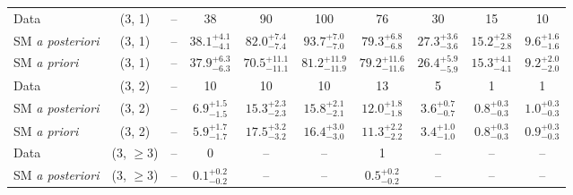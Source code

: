 \begin{table}[h!]
{\begin{tabular}{lccccccccc}
    Data                  & (3, 1)           & --                            & 38                            & 90                          & 100                         & 76                          & 30                          & 15                         & 10                         \\[0.5ex] 
    SM {\it a posteriori} & (3, 1)           & --                            & $38.1^{+ 4.1 }_{- 4.1 }$      & $82.0^{+ 7.4 }_{- 7.4 }$    & $93.7^{+ 7.0 }_{- 7.0 }$    & $79.3^{+ 6.8 }_{- 6.8 }$    & $27.3^{+ 3.6 }_{- 3.6 }$    & $15.2^{+ 2.8 }_{- 2.8 }$   & $9.6^{+ 1.6 }_{- 1.6 }$    \\[0.5ex] 
    SM {\it a priori}     & (3, 1)           & --                            & $37.9^{+ 6.3 }_{- 6.3 }$      & $70.5^{+ 11.1 }_{- 11.1 }$  & $81.2^{+ 11.9 }_{- 11.9 }$  & $79.2^{+ 11.6 }_{- 11.6 }$  & $26.4^{+ 5.9 }_{- 5.9 }$    & $15.3^{+ 4.1 }_{- 4.1 }$   & $9.2^{+ 2.0 }_{- 2.0 }$    \\[0.5ex] 
    Data                  & (3, 2)           & --                            & 10                            & 10                          & 10                          & 13                          & 5                           & 1                          & 1                          \\[0.5ex] 
    SM {\it a posteriori} & (3, 2)           & --                            & $6.9^{+ 1.5 }_{- 1.5 }$       & $15.3^{+ 2.3 }_{- 2.3 }$    & $15.8^{+ 2.1 }_{- 2.1 }$    & $12.0^{+ 1.8 }_{- 1.8 }$    & $3.6^{+ 0.7 }_{- 0.7 }$     & $0.8^{+ 0.3 }_{- 0.3 }$    & $1.0^{+ 0.3 }_{- 0.3 }$    \\[0.5ex] 
    SM {\it a priori}     & (3, 2)           & --                            & $5.9^{+ 1.7 }_{- 1.7 }$       & $17.5^{+ 3.2 }_{- 3.2 }$    & $16.4^{+ 3.0 }_{- 3.0 }$    & $11.3^{+ 2.2 }_{- 2.2 }$    & $3.4^{+ 1.0 }_{- 1.0 }$     & $0.8^{+ 0.3 }_{- 0.3 }$    & $0.9^{+ 0.3 }_{- 0.3 }$    \\[0.5ex] 
    Data                  & (3, $\ge3$)      & --                            & 0                             & --                          & --                          & 1                           & --                          & --                         & --                         \\[0.5ex] 
    SM {\it a posteriori} & (3, $\ge3$)      & --                            & $0.1^{+ 0.2 }_{- 0.2 }$       & --                          & --                          & $0.5^{+ 0.2 }_{- 0.2 }$     & --                          & --                         & --                         \\[0.5ex] 

\end{tabular}}
\end{table}
